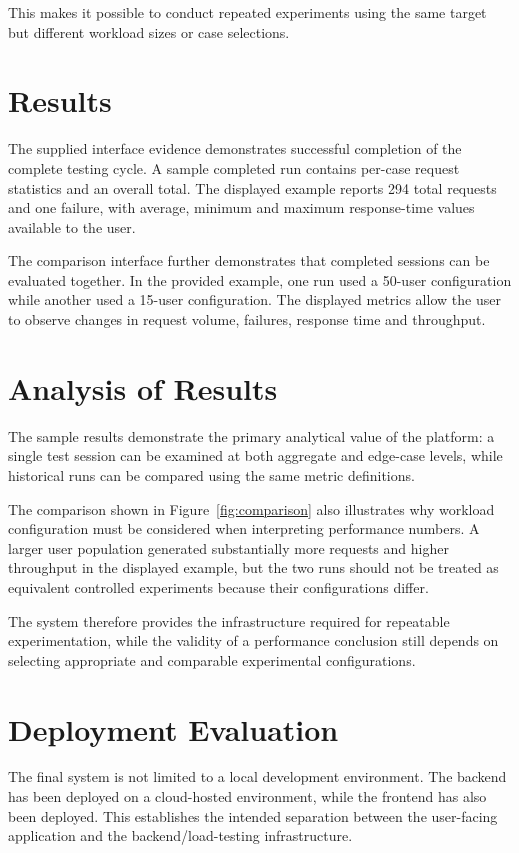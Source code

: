 \documentclass{tietreport}
\begin{document}
This makes it possible to conduct repeated experiments using the same target but different workload sizes or case selections.

\section{Results}

The supplied interface evidence demonstrates successful completion of the complete testing cycle. A sample completed run contains per-case request statistics and an overall total. The displayed example reports 294 total requests and one failure, with average, minimum and maximum response-time values available to the user.

The comparison interface further demonstrates that completed sessions can be evaluated together. In the provided example, one run used a 50-user configuration while another used a 15-user configuration. The displayed metrics allow the user to observe changes in request volume, failures, response time and throughput.

\section{Analysis of Results}

The sample results demonstrate the primary analytical value of the platform: a single test session can be examined at both aggregate and edge-case levels, while historical runs can be compared using the same metric definitions.

The comparison shown in Figure~\ref{fig:comparison} also illustrates why workload configuration must be considered when interpreting performance numbers. A larger user population generated substantially more requests and higher throughput in the displayed example, but the two runs should not be treated as equivalent controlled experiments because their configurations differ.

The system therefore provides the infrastructure required for repeatable experimentation, while the validity of a performance conclusion still depends on selecting appropriate and comparable experimental configurations.

\section{Deployment Evaluation}

The final system is not limited to a local development environment. The backend has been deployed on a cloud-hosted environment, while the frontend has also been deployed. This establishes the intended separation between the user-facing application and the backend/load-testing infrastructure.
\end{document}
